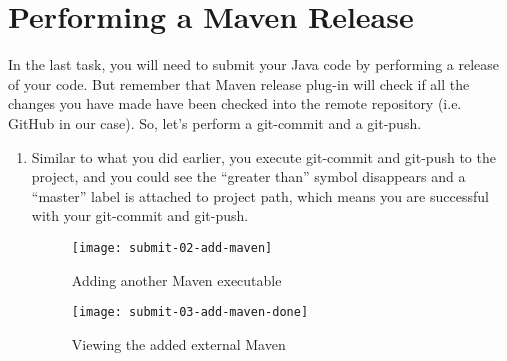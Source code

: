 
\section{Performing a Maven Release}

In the last task, you will need to submit your Java code by performing a release of your code. But remember that Maven release plug-in will check if all the changes you have made have been checked into the remote repository (i.e. GitHub in our case). So, let's perform a git-commit and a git-push.

\begin{enumerate}

\begin{figure}
\hspace{-1em}
\begin{minipage}{0.5\textwidth}
\centering
\texttt{[image: simple-code-05-commit]}
\caption{Performing a git-commit/push before preparing a release\label{simple-code-05-commit}}
\end{minipage}
\hfill
\begin{minipage}{0.5\textwidth}
\centering
\texttt{[image: submit-01-preference]}
\caption{Starting to add an external Maven executable\label{submit-01-preference}}
\end{minipage}
\hspace{-1em}
\end{figure}

\item Similar to what you did earlier, you execute git-commit and git-push to the project, and you could see the ``greater than'' symbol disappears and a ``master'' label is attached to project path, which means you are successful with your git-commit and git-push.

\begin{figure}
\hspace{-2em}
\begin{minipage}{0.5\textwidth}
\centering
\texttt{[image: submit-02-add-maven]}
\caption{Adding another Maven executable\label{submit-02-add-maven}}
\end{minipage}
\hfill
\begin{minipage}{0.5\textwidth}
\centering
\texttt{[image: submit-03-add-maven-done]}
\caption{Viewing the added external Maven\label{submit-03-add-maven-done}}
\end{minipage}
\hspace{-2em}
\end{figure}


\end{enumerate}
